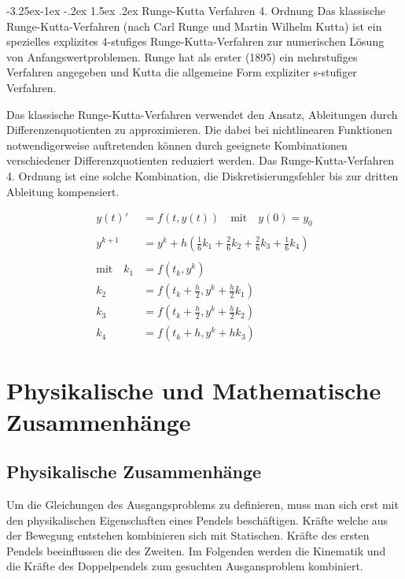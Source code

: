 \documentclass[12pt]{article}
\makeatletter
\numberwithin{equation}{subsection}
\renewcommand\paragraph{\@startsection{paragraph}{4}{\z@}%
  {-3.25ex\@plus -1ex \@minus -.2ex}%
  {1.5ex \@plus .2ex}%
  {\normalfont\normalsize\bfseries}}
\makeatother
\begin{document}
\paragraph{Runge-Kutta Verfahren 4. Ordnung}
Das klassische Runge-Kutta-Verfahren (nach Carl Runge und Martin Wilhelm Kutta) ist ein spezielles explizites 4-stufiges Runge-Kutta-Verfahren zur numerischen Lösung von Anfangswertproblemen. Runge hat als erster (1895) ein mehrstufiges Verfahren angegeben und Kutta die allgemeine Form expliziter s-stufiger Verfahren.

Das klassische Runge-Kutta-Verfahren verwendet den Ansatz, Ableitungen durch Differenzenquotienten zu approximieren. Die dabei bei nichtlinearen Funktionen notwendigerweise auftretenden können durch geeignete Kombinationen verschiedener Differenzquotienten reduziert werden. Das Runge-Kutta-Verfahren 4. Ordnung ist eine solche Kombination, die Diskretisierungsfehler bis zur dritten Ableitung kompensiert.

\begin{align*}
	y(t)' &= f(t,y(t)) \quad \text{mit} \quad y(0) = y_0
	\\
	\\
	y^{k+1} &= y^k + h \left(\frac{1}{6}k_1 + \frac{2}{6}k_2 + \frac{2}{6}k_3 + \frac{1}{6}k_4 \right)
	\\
	\\
	\text{mit} \quad k_1 &= f(t_k, y^k)\\
	k_2 &= f\left(t_k + \frac{h}{2}, y^k + \frac{h}{2}k_1 \right)\\
	k_3 &= f\left(t_k + \frac{h}{2}, y^k + \frac{h}{2}k_2 \right)\\
	k_4 &= f\left(t_k + h, y^k + h k_3 \right)
\end{align*}

\newpage
\section{Physikalische und Mathematische Zusammenhänge}
\subsection{Physikalische Zusammenhänge}
Um die Gleichungen des Ausgangsproblems zu definieren, muss man sich erst mit den physikalischen Eigenschaften eines Pendels beschäftigen. Kräfte welche aus der Bewegung entstehen  kombinieren sich mit Statischen. Kräfte des ersten Pendels beeinflussen die des Zweiten. Im Folgenden werden die Kinematik und die Kräfte des Doppelpendels zum gesuchten Ausgansproblem kombiniert.
\end{document}
